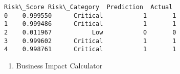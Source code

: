 \documentclass[11pt]{article}
\makeatletter
\providecommand{\tightlist}{%
      \setlength{\itemsep}{0pt}\setlength{\parskip}{0pt}}
\newcommand{\boxspacing}{\kern\kvtcb@left@rule\kern\kvtcb@boxsep}
\newcommand{\prompt}[4]{
        {\ttfamily\llap{{\color{#2}[#3]:\hspace{3pt}#4}}\vspace{-\baselineskip}}
    }
\makeatother
\begin{document}
            \begin{tcolorbox}[breakable, size=fbox, boxrule=.5pt, pad at break*=1mm, opacityfill=0]
\prompt{Out}{outcolor}{27}{\boxspacing}
\begin{Verbatim}[commandchars=\\\{\}]
   Risk\_Score Risk\_Category  Prediction  Actual
0    0.999550      Critical           1       1
1    0.999486      Critical           1       1
2    0.011967           Low           0       0
3    0.999602      Critical           1       1
4    0.998761      Critical           1       1
\end{Verbatim}
\end{tcolorbox}
        
    \begin{enumerate}
\def\labelenumi{\arabic{enumi}.}
\setcounter{enumi}{7}
\tightlist
\item
  Business Impact Calculator
\end{enumerate}
\end{document}

